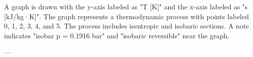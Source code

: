 A graph is drawn with the y-axis labeled as "T [K]" and the x-axis labeled as "s [kJ/kg·K]". The graph represents a thermodynamic process with points labeled 0, 1, 2, 3, 4, and 5. The process includes isentropic and isobaric sections. A note indicates "isobar p = 0.1916 bar" and "isobaric reversible" near the graph.

---
